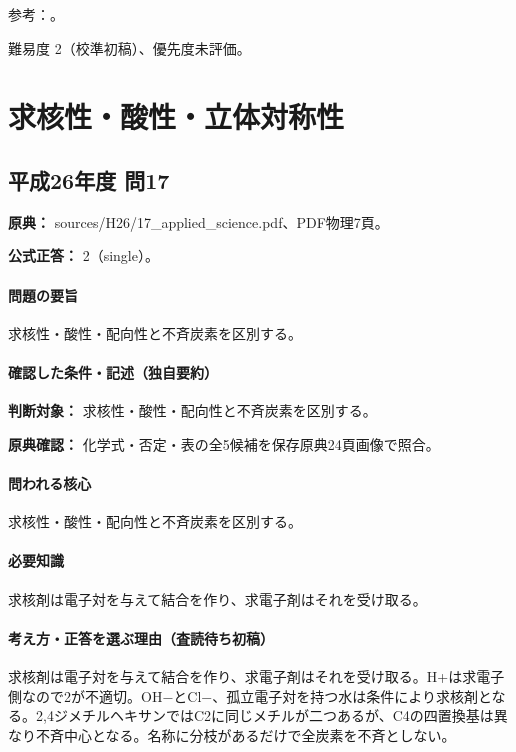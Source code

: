 \par 参考：\cite{organic_methane,organic_isomers}。

\par 難易度 2（校準初稿）、優先度未評価。

\section{求核性・酸性・立体対称性}

\subsection{平成26年度 問17}
\label{q:h26-reg-applied-17}

\noindent\textbf{原典：} sources/H26/17\_applied\_science.pdf、PDF物理7頁。

\textbf{公式正答：} 2（single）。

\paragraph{問題の要旨} 求核性・酸性・配向性と不斉炭素を区別する。

\paragraph{確認した条件・記述（独自要約）}\mbox{}\par

\noindent\textbf{判断対象：} 求核性・酸性・配向性と不斉炭素を区別する。\par

\noindent\textbf{原典確認：} 化学式・否定・表の全5候補を保存原典24頁画像で照合。\par

\paragraph{問われる核心} 求核性・酸性・配向性と不斉炭素を区別する。

\paragraph{必要知識} 求核剤は電子対を与えて結合を作り、求電子剤はそれを受け取る。

\paragraph{考え方・正答を選ぶ理由（査読待ち初稿）} 求核剤は電子対を与えて結合を作り、求電子剤はそれを受け取る。H+は求電子側なので2が不適切。OH−とCl−、孤立電子対を持つ水は条件により求核剤となる。2,4ジメチルヘキサンではC2に同じメチルが二つあるが、C4の四置換基は異なり不斉中心となる。名称に分枝があるだけで全炭素を不斉としない。

